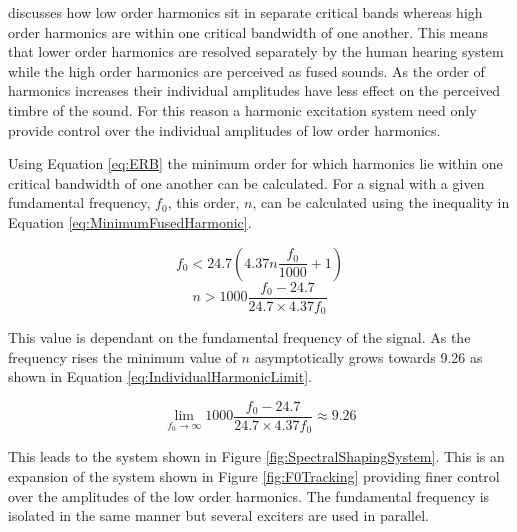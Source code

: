 		\citet{howard2009acoustics} discusses how low order harmonics sit in separate critical bands whereas high
		order harmonics are within one critical bandwidth of one another. This means that lower order harmonics are
		resolved separately by the human hearing system while the high order harmonics are perceived as fused
		sounds. As the order of harmonics increases their individual amplitudes have less effect on the perceived
		timbre of the sound. For this reason a harmonic excitation system need only provide control over the
		individual amplitudes of low order harmonics. 

		Using Equation \ref{eq:ERB} the minimum order for which harmonics lie within one critical bandwidth of one
		another can be calculated. For a signal with a given fundamental frequency, $f_{0}$, this order, $n$, can
		be calculated using the inequality in Equation \ref{eq:MinimumFusedHarmonic}.

		\[ f_{0} < 24.7 \left( 4.37n \frac{f_{0}}{1000} + 1 \right) \]
		\begin{equation}
			n > 1000 \frac{f_{0} - 24.7}{24.7 \times 4.37f_{0}}
			\label{eq:MinimumFusedHarmonic}
		\end{equation}

		This value is dependant on the fundamental frequency of the signal. As the frequency rises the minimum
		value of $n$ asymptotically grows towards 9.26 as shown in Equation \ref{eq:IndividualHarmonicLimit}.

		\begin{equation}
			\lim_{f_{0} \to \infty} 1000 \frac{f_{0} - 24.7}{24.7 \times 4.37f_{0}} \approx 9.26
			\label{eq:IndividualHarmonicLimit}
		\end{equation}

		This leads to the system shown in Figure \ref{fig:SpectralShapingSystem}. This is an expansion of the
		system shown in Figure \ref{fig:F0Tracking} providing finer control over the amplitudes of the low order
		harmonics.  The fundamental frequency is isolated in the same manner but several exciters are used in
		parallel.

